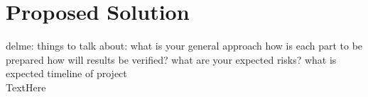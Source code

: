 \section{Proposed Solution}
delme: things to talk about: 
	what is your general approach
	how is each part to be prepared
	how will results be verified?
	what are your expected risks?
	what is expected timeline of project \\
TextHere



















